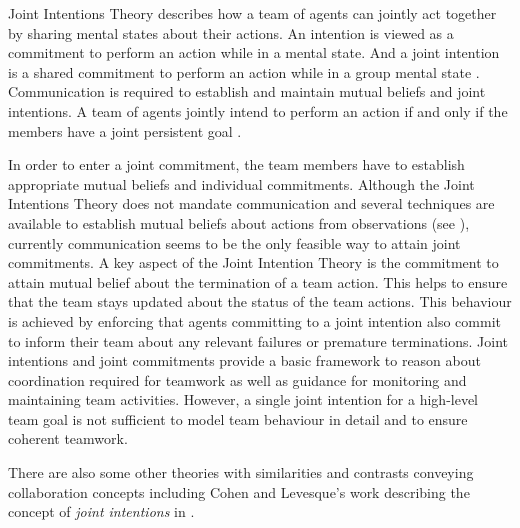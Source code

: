 \documentclass[11pt]{article}
\begin{document}
Joint Intentions Theory describes how a team of agents can jointly act together
by sharing mental states about their actions. An intention is viewed as a
commitment to perform an action while in a mental state. And a joint intention
is a shared commitment to perform an action while in a group mental state
\cite{cohen:intention-commitment}. Communication is required to establish and
maintain mutual beliefs and joint intentions. A team of agents jointly intend to
perform an action if and only if the members have a joint persistent goal
\cite{cohen:teamwork}.

In order to enter a joint commitment, the team members have to establish
appropriate mutual beliefs and individual commitments. Although the Joint
Intentions Theory does not mandate communication and several techniques are
available to establish mutual beliefs about actions from observations (see
\cite{huber:without-communication}), currently communication seems to be the
only feasible way to attain joint commitments. A key aspect of the Joint
Intention Theory is the commitment to attain mutual belief about the termination
of a team action. This helps to ensure that the team stays updated about the
status of the team actions. This behaviour is achieved by enforcing that agents
committing to a joint intention also commit to inform their team about any
relevant failures or premature terminations. Joint intentions and joint
commitments provide a basic framework to reason about coordination required for
teamwork as well as guidance for monitoring and maintaining team activities.
However, a single joint intention for a high-level team goal is not sufficient
to model team behaviour in detail and to ensure coherent teamwork.

There are also some other theories with similarities and contrasts conveying
collaboration concepts including Cohen and Levesque's work describing the
concept of \textit{joint intentions} in \cite{cohen:teamwork,
levesque:acting-together}.
\end{document}
